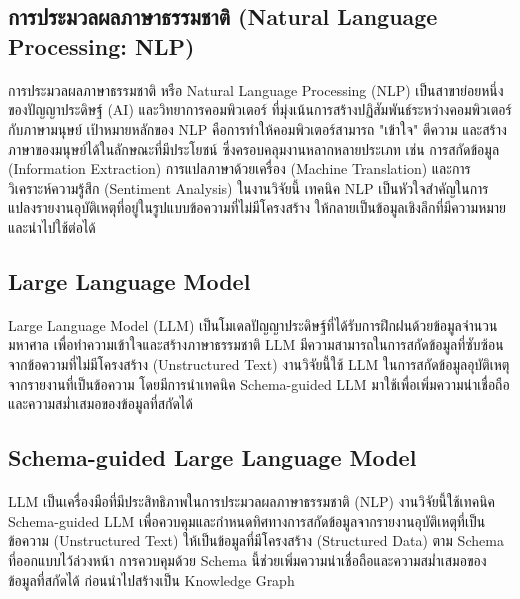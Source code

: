 \subsection{การประมวลผลภาษาธรรมชาติ (Natural Language Processing: NLP)}\label{sec:NLP}
\paragraph{}
การประมวลผลภาษาธรรมชาติ หรือ Natural Language Processing (NLP) เป็นสาขาย่อยหนึ่งของปัญญาประดิษฐ์ (AI) และวิทยาการคอมพิวเตอร์ ที่มุ่งเน้นการสร้างปฏิสัมพันธ์ระหว่างคอมพิวเตอร์กับภาษามนุษย์ เป้าหมายหลักของ NLP คือการทำให้คอมพิวเตอร์สามารถ "เข้าใจ" ตีความ และสร้างภาษาของมนุษย์ได้ในลักษณะที่มีประโยชน์ ซึ่งครอบคลุมงานหลากหลายประเภท เช่น การสกัดข้อมูล (Information Extraction) การแปลภาษาด้วยเครื่อง (Machine Translation) และการวิเคราะห์ความรู้สึก (Sentiment Analysis) ในงานวิจัยนี้ เทคนิค NLP เป็นหัวใจสำคัญในการแปลงรายงานอุบัติเหตุที่อยู่ในรูปแบบข้อความที่ไม่มีโครงสร้าง ให้กลายเป็นข้อมูลเชิงลึกที่มีความหมายและนำไปใช้ต่อได้

\subsection{Large Language Model}
\paragraph{}
Large Language Model (LLM) เป็นโมเดลปัญญาประดิษฐ์ที่ได้รับการฝึกฝนด้วยข้อมูลจำนวนมหาศาล เพื่อทำความเข้าใจและสร้างภาษาธรรมชาติ LLM มีความสามารถในการสกัดข้อมูลที่ซับซ้อนจากข้อความที่ไม่มีโครงสร้าง (Unstructured Text) งานวิจัยนี้ใช้ LLM ในการสกัดข้อมูลอุบัติเหตุจากรายงานที่เป็นข้อความ โดยมีการนำเทคนิค Schema-guided LLM มาใช้เพื่อเพิ่มความน่าเชื่อถือและความสม่ำเสมอของข้อมูลที่สกัดได้

\subsection{Schema-guided Large Language Model}\label{sec:sgLLM}
\paragraph{}
LLM เป็นเครื่องมือที่มีประสิทธิภาพในการประมวลผลภาษาธรรมชาติ (NLP) \cite{khot2024prompting} งานวิจัยนี้ใช้เทคนิค Schema-guided LLM เพื่อควบคุมและกำหนดทิศทางการสกัดข้อมูลจากรายงานอุบัติเหตุที่เป็นข้อความ (Unstructured Text) ให้เป็นข้อมูลที่มีโครงสร้าง (Structured Data) ตาม Schema ที่ออกแบบไว้ล่วงหน้า \cite{liyan2022analysis} การควบคุมด้วย Schema นี้ช่วยเพิ่มความน่าเชื่อถือและความสม่ำเสมอของข้อมูลที่สกัดได้ ก่อนนำไปสร้างเป็น Knowledge Graph \cite{liyan2022analysis}

